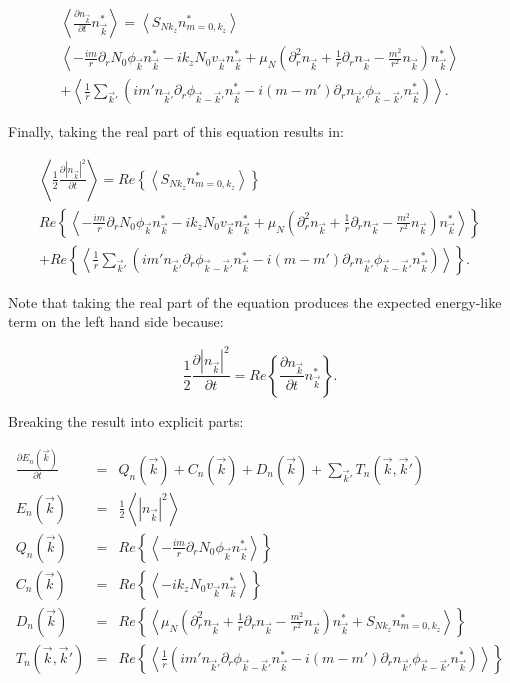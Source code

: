 \documentclass[showpacs,preprintnumbers,amsmath,amssymb,superscriptaddress,aip]{revtex4-1}
\def\beq{\begin{equation}}
\def\eeq{\end{equation}}
\def\beqar{\begin{eqnarray}}
\def\eeqar{\end{eqnarray}}
\newcommand{\pdiff}[2]{\frac{\partial#1}{\partial#2}}
\newcommand{\pdr}{\partial_r}
\newcommand{\pdrr}{\partial^2_r}
\begin{document}
\beqar
\label{density_evolution}
\left< \pdiff{n_{\vec{k}}}{t} n_{\vec{k}}^* \right> = \left< S_{N k_z} n_{m=0,k_z}^* \right>  \nonumber \\
\left< -\frac{i m}{r} \pdr N_0 \phi_{\vec{k}} n_{\vec{k}}^* - i k_z N_0 v_{\vec{k}} n_{\vec{k}}^* + \mu_N( \pdrr n_{\vec{k}} + \frac{1}{r} \pdr n_{\vec{k}} - \frac{m^2}{r^2} n_{\vec{k}}) n_{\vec{k}}^*  \right> \nonumber \\
+ \left< \frac{1}{r} \sum_{\vec{k}'} \left( i m' n_{\vec{k}'} \pdr \phi_{\vec{k}-\vec{k}'} n_{\vec{k}}^*  - i (m - m') \pdr n_{\vec{k}'} \phi_{\vec{k}-\vec{k}'} n_{\vec{k}}^*        \right) \right>.
\eeqar

Finally, taking the real part of this equation results in:

\beqar
\label{real_density_evolution}
\left< \frac{1}{2} \pdiff{|n_{\vec{k}}|^2}{t} \right> = Re \left\{ \left< S_{N k_z} n_{m=0,k_z}^* \right> \right\} \nonumber \\
Re \left\{ \left< -\frac{i m}{r} \pdr N_0 \phi_{\vec{k}} n_{\vec{k}}^* - i k_z N_0 v_{\vec{k}} n_{\vec{k}}^* + \mu_N( \pdrr n_{\vec{k}} + \frac{1}{r} \pdr n_{\vec{k}} - \frac{m^2}{r^2} n_{\vec{k}}) n_{\vec{k}}^* \right> \right\} \nonumber \\
+ Re \left\{ \left< \frac{1}{r} \sum_{\vec{k}'} \left( i m' n_{\vec{k}'} \pdr \phi_{\vec{k}-\vec{k}'} n_{\vec{k}}^*  - i (m - m') \pdr n_{\vec{k}'} \phi_{\vec{k}-\vec{k}'} n_{\vec{k}}^*        \right) \right> \right\}.
\eeqar

Note that taking the real part of the equation produces the expected energy-like term on the left hand side because:

\beq
\frac{1}{2} \pdiff{|n_{\vec{k}}|^2}{t} = Re \left\{ \pdiff{n_{\vec{k}}}{t} n_{\vec{k}}^* \right\}.
\eeq

Breaking the result into explicit parts:

\beqar
\label{Fourier_density_evolution}
\pdiff{E_n(\vec{k})}{t} & = & Q_n(\vec{k}) + C_n(\vec{k}) + D_n(\vec{k}) + \sum_{\vec{k}'} T_n(\vec{k},\vec{k}') \\
E_n(\vec{k}) & = & \frac{1}{2} \left< |n_{\vec{k}}|^2 \right> \\
Q_n(\vec{k}) & = & Re \left\{ \left< -\frac{i m}{r} \pdr N_0 \phi_{\vec{k}} n_{\vec{k}}^* \right> \right\} \\
C_n(\vec{k}) & = & Re \left\{ \left< - i k_z N_0 v_{\vec{k}} n_{\vec{k}}^* \right> \right\} \\
D_n(\vec{k}) & = & Re \left\{ \left<  \mu_N( \pdrr n_{\vec{k}} + \frac{1}{r} \pdr n_{\vec{k}} - \frac{m^2}{r^2} n_{\vec{k}}) n_{\vec{k}}^*  + S_{N k_z} n_{m=0,k_z}^*  \right> \right\} \\
T_n(\vec{k},\vec{k}') & = & Re \left\{ \left< \frac{1}{r} \left( i m' n_{\vec{k}'} \pdr \phi_{\vec{k}-\vec{k}'} n_{\vec{k}}^*  - i (m - m') \pdr n_{\vec{k}'} \phi_{\vec{k}-\vec{k}'} n_{\vec{k}}^*        \right) \right> \right\}
\eeqar
\end{document}
